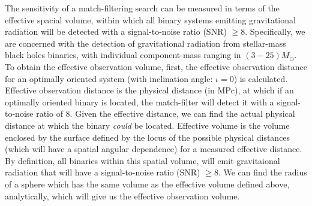 \documentclass[aps,
prd,
amsmath,
amssymb,
twocolumn,
floatfix,
groupedaddress]{revtex4-1}
\begin{document}
The sensitivity of a match-filtering search can be measured in terms of the effective spacial volume, within which all binary systems emitting gravitational radiation will be detected with a signal-to-noise ratio (SNR) $\geq 8$. Specifically, we are concerned with the detection of gravitational radiation from stellar-mass black holes binaries, with individual component-mass ranging in $(3-25)M_{\odot}$. To obtain the effective observation volume, first, the effective observation distance for an optimally oriented system (with inclination angle: $\iota=0$) is calculated. Effective observation distance is the physical distance (in MPc), at which if an optimally oriented binary is located, the match-filter will detect it with a signal-to-noise ratio of 8. Given the effective distance, we can find the actual physical distance at which the binary \textit{could} be located. Effective volume is the volume enclosed by the surface defined by the locus of the possible physical distances (which will have a spatial angular dependence) for a measured effective distance. By definition, all binaries within this spatial volume, will emit gravitaional radiation that will have a signal-to-noise ratio (SNR) $\geq 8$. We can find the radius of a sphere which has the same volume as the effective volume defined above, analytically, which will give us the effective observation volume.
\end{document}
